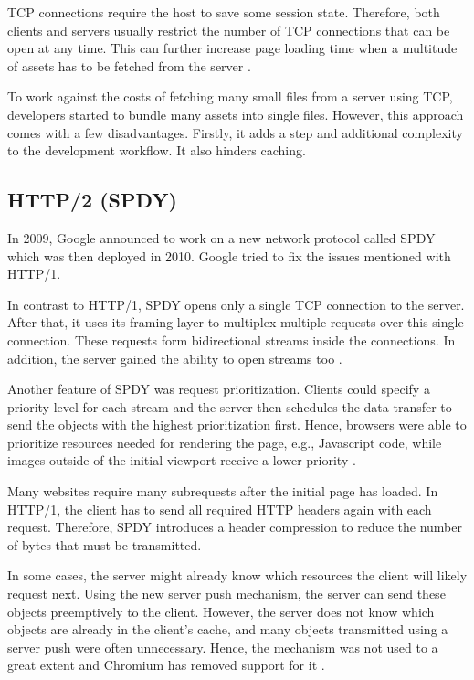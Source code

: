 \documentclass[conference]{IEEEtran}
\begin{document}
TCP connections require the host to save some session state. Therefore, both clients and servers usually restrict the number of TCP connections that can be open at any time. This can further increase page loading time when a multitude of assets has to be fetched from the server \cite{HowQuickIsQuic}. 


To work against the costs of fetching many small files from a server using TCP, developers started to bundle many assets into single files. However, this approach comes with a few disadvantages. Firstly, it adds a step and additional complexity to the development workflow. It also hinders caching.

\subsection{HTTP/2 (SPDY)}

In 2009, Google announced to work on a new network protocol called SPDY which was then deployed in 2010. Google tried to fix the issues mentioned with HTTP/1.

In contrast to HTTP/1, SPDY opens only a single TCP connection to the server. After that, it uses its framing layer to multiplex multiple requests over this single connection. These requests form bidirectional streams inside the connections. In addition, the server gained the ability to open streams too \cite{HowQuickIsQuic}.

Another feature of SPDY was request prioritization. Clients could specify a priority level for each stream and the server then schedules the data transfer to send the objects with the highest prioritization first. Hence, browsers were able to prioritize resources needed for rendering the page, e.g., Javascript code, while images outside of the initial viewport receive a lower priority \cite{HowQuickIsQuic}.

Many websites require many subrequests after the initial page has loaded. In HTTP/1, the client has to send all required HTTP headers again with each request. Therefore, SPDY introduces a header compression to reduce the number of bytes that must be transmitted.

In some cases, the server might already know which resources the client will likely request next. Using the new server push mechanism, the server can send these objects preemptively to the client. However, the server does not know which objects are already in the client's cache, and many objects transmitted using a server push were often unnecessary. Hence, the mechanism was not used to a great extent and Chromium has removed support for it \cite{RemoveServerPush}.
\end{document}
